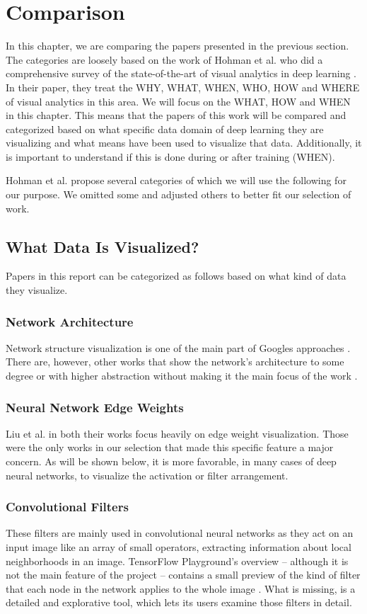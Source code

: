 \documentclass{acmsiggraph}               %
\begin{document}
\section{Comparison}
In this chapter, we are comparing the papers presented in the previous section. 
The categories are loosely based on the work of Hohman et al. who did a comprehensive survey of the state-of-the-art of visual analytics in deep learning \cite{Hohman2018}.
In their paper, they treat the WHY, WHAT, WHEN, WHO, HOW and WHERE of visual analytics in this area.
We will focus on the WHAT, HOW and WHEN in this chapter. This means that the papers of this work will be compared and categorized based on what specific data domain of deep learning they are visualizing and what means have been used to visualize that data. Additionally, it is important to understand if this is done during or after training (WHEN).

Hohman et al. propose several categories of which we will use the following for our purpose. We omitted some and adjusted others to better fit our selection of work.

\subsection{What Data Is Visualized?}
Papers in this report can be categorized as follows based on what kind of data they visualize.
\subsubsection{Network Architecture}
Network structure visualization is one of the main part of Googles approaches \cite{Wongsuphasawat2018,Smilkov2017}.
There are, however, other works that show the network's architecture to some degree or with higher abstraction without making it the main focus of the work \cite{Liu2016,Liu2018}.
\subsubsection{Neural Network Edge Weights}
Liu et al. in both their works \cite{Liu2016,Liu2018} focus heavily on edge weight visualization. Those were the only works in our selection that made this specific feature a major concern. As will be shown below, it is more favorable, in many cases of deep neural networks, to visualize the activation or filter arrangement.
\subsubsection{Convolutional Filters}
These filters are mainly used in convolutional neural networks as they act on an input image like an array of small operators, extracting information about local neighborhoods in an image. TensorFlow Playground's overview -- although it is not the main feature of the project -- contains a small preview of the kind of filter that each node in the network applies to the whole image \cite{Smilkov2017}. What is missing, is a detailed and explorative tool, which lets its users examine those filters in detail.
\end{document}
